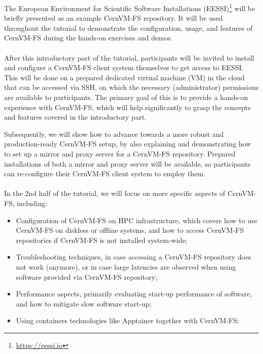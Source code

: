The European Environment for Scientific Software Installations
(EESSI)\footnote{\href{https://eessi.io}{https://eessi.io}}
will be briefly presented as an example CernVM-FS repository.
It will be used throughout the tutorial to demonstrate the configuration, usage, and features of CernVM-FS
during the hands-on exercises and demos.

\paragraph{} 
After this introductory part of the tutorial, participants will be invited to install and configure a CernVM-FS
client system themselves
to get access to EESSI. This will be done on a prepared dedicated virtual machine (VM) in the cloud that can
be accessed via SSH,
on which the necessary (administrator) permissions are available to participants. The primary goal of this is to provide a hands-on experience
with CernVM-FS, which will help significantly to grasp the concepts and features covered in the introductory part.

Subsequently, we will show how to advance towards a more robust and production-ready CernVM-FS setup,
by also explaining and demonstrating how to set up a mirror and proxy server for a CernVM-FS repository.
Prepared installations of both a mirror and proxy server will be available, so participants can re-configure
their CernVM-FS client system to employ them.

\paragraph{}
In the 2nd half of the tutorial, we will focus on more specific aspects of CernVM-FS, including:
\begin{itemize}
\item Configuration of CernVM-FS on HPC infrastructure, which covers how to use CernVM-FS on diskless or offline systems,
      and how to access CernVM-FS repositories if CernVM-FS is not installed system-wide;
\item Troubleshooting techniques, in case accessing a CernVM-FS repository does not work (anymore), or in case
      large latencies are observed when using software provided via CernVM-FS repository;
\item Performance aspects, primarily evaluating start-up performance of software, and how to mitigate slow software
      start-up;
\item Using containers technologies like Apptainer together with CernVM-FS;
\end{itemize}

